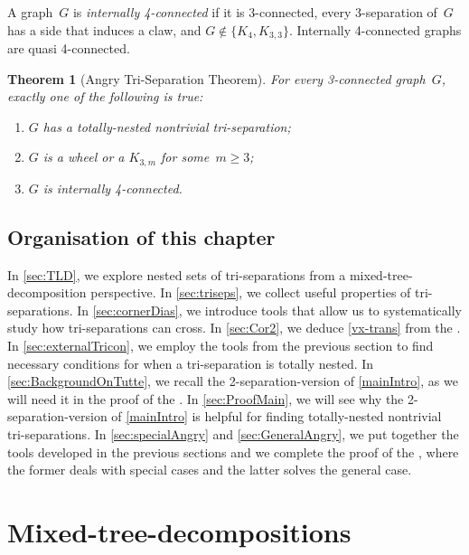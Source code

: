 \documentclass{aic}
\theoremstyle{plain}
\newtheorem{thm}{Theorem}[section]
\theoremstyle{definition}
\theoremstyle{plain}
\theoremstyle{plain}
\renewcommand{\ge}{\geqslant}
\begin{document}
A graph~$G$ is \emph{internally 4-connected} if it is 3-connected, every 3-separation of~$G$ has a side that induces a claw, and $G\notin\{ K_4,K_{3,3}\}$.
Internally 4-connected graphs are quasi 4-connected.

\begin{thm}[Angry Tri-Separation Theorem]\label{Angry}
For every 3-connected graph~$G$, exactly one of the following is true:
\begin{enumerate}
    \item $G$ has a totally-nested nontrivial tri-separation;
    \item $G$ is a wheel or a $K_{3,m}$ for some~$m\ge 3$;
    \item $G$ is internally 4-connected.
\end{enumerate}
\end{thm}


\subsection{Organisation of this chapter}

In \autoref{sec:TLD}, we explore nested sets of tri-separations from a mixed-tree-decomposition perspective.
In \autoref{sec:triseps}, we collect useful properties of tri-separations.
In \autoref{sec:cornerDias}, we introduce tools that allow us to systematically study how tri-separations can cross.
In \autoref{sec:Cor2}, we deduce \autoref{vx-trans} from the .
In \autoref{sec:externalTricon}, we employ the tools from the previous section to find necessary conditions for when a tri-separation is totally nested.
In \autoref{sec:BackgroundOnTutte}, we recall the 2-separation-version of \autoref{mainIntro}, as we will need it in the proof of the .
In \autoref{sec:ProofMain}, we will see why the 2-separation-version of \autoref{mainIntro} is helpful for finding totally-nested nontrivial tri-separations.
In \autoref{sec:specialAngry} and \autoref{sec:GeneralAngry}, we put together the tools developed in the previous sections and we complete the proof of the , where the former deals with special cases and the latter solves the general case.





\section{Mixed-tree-decompositions}\label{sec:TLD}
\end{document}
